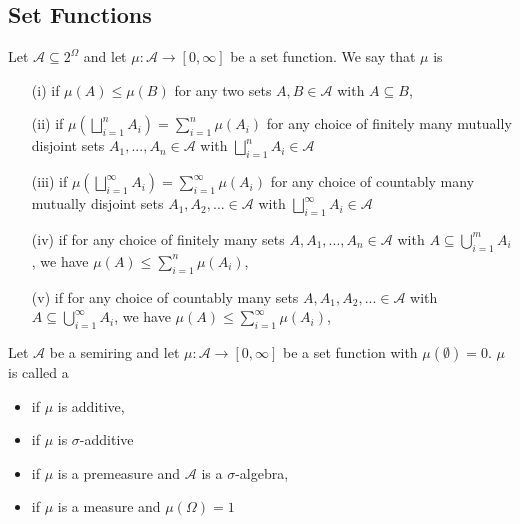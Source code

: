 \documentclass[12pt, a4paper, oneside, openright, titlepage]{book}
\begin{document}
\subsection{Set Functions}

\begin{defn}
    Let $\mathcal{A} \subseteq 2^{\Omega}$ and let $\mu:\mathcal{A}\rightarrow [0,\infty]$ be a set function. We say that $\mu$ is \begin{itemize}
        \item[(i)]  if $\mu(A) \leq \mu(B)$ for any two sets $A,B\in\mathcal{A}$ with $A\subseteq B$,
        \item[(ii)]  if $\mu\left(\bigsqcup_{i=1}^nA_i\right) = \sum_{i=1}^n\mu(A_i)$ for any choice of finitely many mutually disjoint sets $A_1,...,A_n \in \mathcal{A}$ with $\bigsqcup_{i=1}^nA_i \in \mathcal{A}$
        \item[(iii)]  if $\mu\left(\bigsqcup_{i=1}^{\infty}A_i\right) = \sum_{i=1}^{\infty}\mu(A_i)$ for any choice of countably many mutually disjoint sets $A_1,A_2,... \in \mathcal{A}$ with $\bigsqcup_{i=1}^{\infty}A_i \in \mathcal{A}$
        \item[(iv)]  if for any choice of finitely many sets $A,A_1,...,A_n \in \mathcal{A}$ with $A \subseteq \bigcup_{i=1}^mA_i$, we have $\mu(A) \leq \sum_{i=1}^n\mu(A_i)$, 
        \item[(v)]  if for any choice of countably many sets $A,A_1,A_2,... \in \mathcal{A}$ with $A \subseteq \bigcup_{i=1}^{\infty}A_i$, we have $\mu(A) \leq \sum_{i=1}^{\infty}\mu(A_i)$,
    \end{itemize}
\end{defn}


\begin{defn}
    Let $\mathcal{A}$ be a semiring and let $\mu:\mathcal{A}\rightarrow [0,\infty]$ be a set function with $\mu(\emptyset) = 0$. $\mu$ is called a \begin{itemize}
        \item {} if $\mu$ is additive,
        \item {} if $\mu$ is $\sigma$-additive
        \item {} if $\mu$ is a premeasure and $\mathcal{A}$ is a $\sigma$-algebra, 
        \item {} if $\mu$ is a measure and $\mu(\Omega) = 1$
    \end{itemize}
\end{defn}
\end{document}
